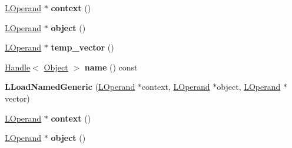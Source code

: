\begin{DoxyCompactItemize}
\item 
\hyperlink{classv8_1_1internal_1_1_l_operand}{L\+Operand} $\ast$ {\bfseries context} ()\hypertarget{classv8_1_1internal_1_1_l_load_named_generic_a61d03d8bff411819ec103caee4b20d95}{}\label{classv8_1_1internal_1_1_l_load_named_generic_a61d03d8bff411819ec103caee4b20d95}

\item 
\hyperlink{classv8_1_1internal_1_1_l_operand}{L\+Operand} $\ast$ {\bfseries object} ()\hypertarget{classv8_1_1internal_1_1_l_load_named_generic_ac545174d6ce0223254278aa25992bcf1}{}\label{classv8_1_1internal_1_1_l_load_named_generic_ac545174d6ce0223254278aa25992bcf1}

\item 
\hyperlink{classv8_1_1internal_1_1_l_operand}{L\+Operand} $\ast$ {\bfseries temp\+\_\+vector} ()\hypertarget{classv8_1_1internal_1_1_l_load_named_generic_ac71e90a4f4d755276a1d76ac24d4ef3d}{}\label{classv8_1_1internal_1_1_l_load_named_generic_ac71e90a4f4d755276a1d76ac24d4ef3d}

\item 
\hyperlink{classv8_1_1internal_1_1_handle}{Handle}$<$ \hyperlink{classv8_1_1internal_1_1_object}{Object} $>$ {\bfseries name} () const \hypertarget{classv8_1_1internal_1_1_l_load_named_generic_a328fcd03d981c29639521ee005f3adc7}{}\label{classv8_1_1internal_1_1_l_load_named_generic_a328fcd03d981c29639521ee005f3adc7}

\item 
{\bfseries L\+Load\+Named\+Generic} (\hyperlink{classv8_1_1internal_1_1_l_operand}{L\+Operand} $\ast$context, \hyperlink{classv8_1_1internal_1_1_l_operand}{L\+Operand} $\ast$object, \hyperlink{classv8_1_1internal_1_1_l_operand}{L\+Operand} $\ast$vector)\hypertarget{classv8_1_1internal_1_1_l_load_named_generic_a6994bc2c7c479c721ec11114ed19423c}{}\label{classv8_1_1internal_1_1_l_load_named_generic_a6994bc2c7c479c721ec11114ed19423c}

\item 
\hyperlink{classv8_1_1internal_1_1_l_operand}{L\+Operand} $\ast$ {\bfseries context} ()\hypertarget{classv8_1_1internal_1_1_l_load_named_generic_a61d03d8bff411819ec103caee4b20d95}{}\label{classv8_1_1internal_1_1_l_load_named_generic_a61d03d8bff411819ec103caee4b20d95}

\item 
\hyperlink{classv8_1_1internal_1_1_l_operand}{L\+Operand} $\ast$ {\bfseries object} ()\hypertarget{classv8_1_1internal_1_1_l_load_named_generic_ac545174d6ce0223254278aa25992bcf1}{}\label{classv8_1_1internal_1_1_l_load_named_generic_ac545174d6ce0223254278aa25992bcf1}


\end{DoxyCompactItemize}
